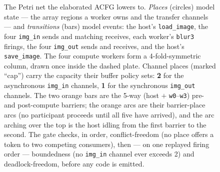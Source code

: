 \begin{figure}[tbp]
{}
  \caption[The stencil's Petri net and soundness gate]{The Petri net the
    elaborated ACFG lowers to. \emph{Places} (circles) model state --- the array
    regions a worker owns and the transfer channels --- and \emph{transitions}
    (bars) model events: the host's \texttt{load\_image}, the four
    \texttt{img\_in} sends and matching receives, each worker's \texttt{blur3}
    firings, the four \texttt{img\_out} sends and receives, and the host's
    \texttt{save\_image}. The four compute workers form a 4-fold-symmetric
    column, drawn once inside the dashed plate. Channel places (marked
    ``cap'') carry the capacity their buffer policy sets: \textbf{2} for the
    asynchronous \texttt{img\_in} channels, \textbf{1} for the synchronous
    \texttt{img\_out} channels. The two orange bars are the 5-way (host $+$
    \texttt{w0}--\texttt{w3}) pre- and post-compute barriers; the orange arcs
    are their barrier-place arcs (no participant proceeds until all five have
    arrived), and the arc arching over the top is the host idling from the
    first barrier to the second. The gate checks, in order, conflict-freedom
    (no place offers a token to two competing consumers), then --- on one
    replayed firing order --- boundedness (no \texttt{img\_in} channel ever
    exceeds 2) and deadlock-freedom, before any code is emitted.}
  \label{fig:wt-net}
\end{figure}
